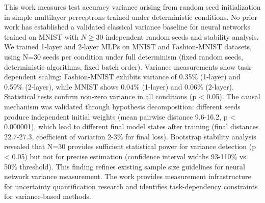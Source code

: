 
This work measures test accuracy variance arising from random seed initialization in simple multilayer perceptrons trained under deterministic conditions. No prior work has established a validated classical variance baseline for neural networks trained on MNIST with $N\geq 30$ independent random seeds and stability analysis. We trained 1-layer and 2-layer MLPs on MNIST and Fashion-MNIST datasets, using N=30 seeds per condition under full determinism (fixed random seeds, deterministic algorithms, fixed batch order). Variance measurements show task-dependent scaling: Fashion-MNIST exhibits variance of 0.35\% (1-layer) and 0.59\% (2-layer), while MNIST shows 0.04\% (1-layer) and 0.06\% (2-layer). Statistical tests confirm non-zero variance in all conditions (p < 0.05). The causal mechanism was validated through hypothesis decomposition: different seeds produce independent initial weights (mean pairwise distance 9.6-16.2, p < 0.000001), which lead to different final model states after training (final distances 22.7-27.3, coefficient of variation 2-3\% for final loss). Bootstrap stability analysis revealed that N=30 provides sufficient statistical power for variance detection (p < 0.05) but not for precise estimation (confidence interval widths 93-110\% vs. 50\% threshold). This finding refines existing sample size guidelines for neural network variance measurement. The work provides measurement infrastructure for uncertainty quantification research and identifies task-dependency constraints for variance-based methods.
